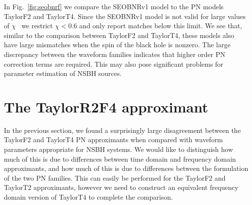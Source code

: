 In Fig.~\ref{fig:seobnrf} we compare the SEOBNRv1 model to the \ac{PN} models
TaylorF2 and TaylorT4.  Since the SEOBNRv1 model is not valid
for large values of $\chi$~\cite{Taracchini:2012ig} we restrict
$\chi < 0.6$ and only report matches below this limit.  We see that,
similar to the comparison between TaylorF2 and TaylorT4, these models also have
large mismatches when the spin of the black hole is nonzero.
The large discrepancy between the waveform families indicates that higher order
\ac{PN} correction terms are required. This may also pose significant problems
for parameter estimation of \ac{NSBH} sources.







\section{The TaylorR2F4 approximant}
\label{sec:R2F4}

In the previous section, we found a surprisingly large disagreement between the TaylorF2 and TaylorT4
\ac{PN} approximants when compared with waveform parameters appropriate for
\ac{NSBH} systems. We would like to distinguish how much of this is due to
differences between time domain and frequency domain approximants, and how much
of this is due to differences between the formulation of the two \ac{PN}
families.  This can easily be performed for the TaylorF2 and TaylorT2
approximants, however we need to construct an equivalent frequency domain
version of TaylorT4 to complete the comparison.

